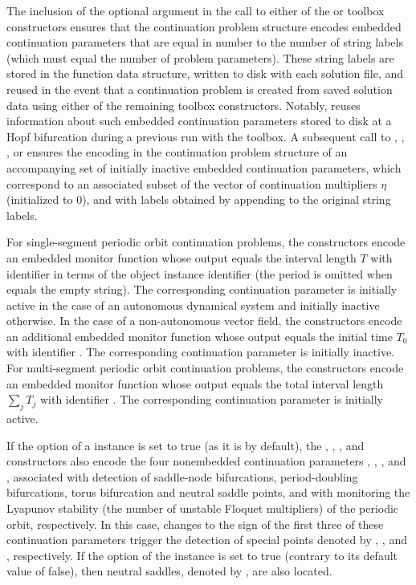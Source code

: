 The inclusion of the  optional argument in the call to either of the  or  toolbox constructors ensures that the continuation problem structure encodes embedded continuation parameters that are equal in number to the number of string labels (which must equal the number of problem parameters). These string labels are stored in the function data structure, written to disk with each solution file, and reused in the event that a continuation problem is created from saved solution data using either of the remaining toolbox constructors. Notably,  reuses information about such embedded continuation parameters stored to disk at a Hopf bifurcation during a previous run with the  toolbox. A subsequent call to , , , or  ensures the encoding in the continuation problem structure of an accompanying set of initially inactive embedded continuation parameters, which correspond to an associated subset of the vector of continuation multipliers $\eta$ (initialized to $0$), and with labels obtained by appending  to the original string labels.

For single-segment periodic orbit continuation problems, the  constructors encode an embedded monitor function whose output equals the interval length $T$ with identifier  in terms of the  object instance identifier  (the period is omitted when  equals the empty string). The corresponding continuation parameter is initially active in the case of an autonomous dynamical system and initially inactive otherwise. In the case of a non-autonomous vector field, the  constructors encode an additional embedded monitor function whose output equals the initial time $T_0$ with identifier . The corresponding continuation parameter is initially inactive. For multi-segment periodic orbit continuation problems, the  constructors encode an embedded monitor function whose output equals the total interval length $\sum_j T_j$ with identifier . The corresponding continuation parameter is initially active.

If the  option of a  instance is set to true (as it is by default), the , , , and  constructors also encode the four nonembedded continuation parameters , , , and , associated with detection of saddle-node bifurcations, period-doubling bifurcations, torus bifurcation and neutral saddle points, and with monitoring the Lyapunov stability (the number of unstable Floquet multipliers) of the periodic orbit, respectively. In this case, changes to the sign of the first three of these continuation parameters trigger the detection of special points denoted by , , and , respectively. If the  option of the  instance is set to true (contrary to its default value of false), then neutral saddles, denoted by , are also located.

